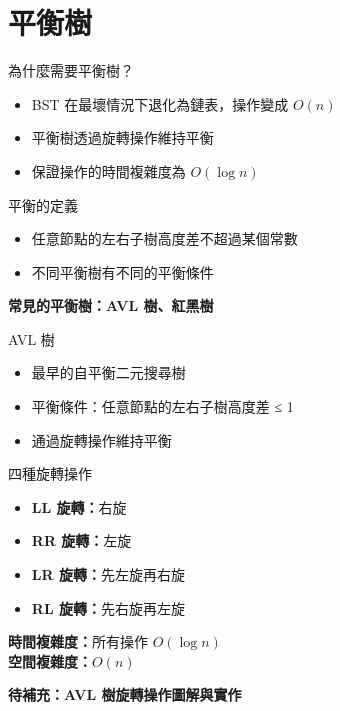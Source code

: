 \documentclass{beamer}
\begin{document}
\section{平衡樹}

\begin{frame}{為什麼需要平衡樹？}
\begin{itemize}
    \item BST 在最壞情況下退化為鏈表，操作變成 $O(n)$
    \item 平衡樹透過旋轉操作維持平衡
    \item 保證操作的時間複雜度為 $O(\log n)$
\end{itemize}

\vspace{1em}
\begin{block}{平衡的定義}
\begin{itemize}
    \item 任意節點的左右子樹高度差不超過某個常數
    \item 不同平衡樹有不同的平衡條件
\end{itemize}
\end{block}

\vspace{1em}
\begin{center}
\textbf{常見的平衡樹：AVL 樹、紅黑樹}
\end{center}
\end{frame}

\begin{frame}{AVL 樹}
\begin{itemize}
    \item 最早的自平衡二元搜尋樹
    \item 平衡條件：任意節點的左右子樹高度差 ≤ 1
    \item 通過旋轉操作維持平衡
\end{itemize}

\vspace{1em}
\begin{block}{四種旋轉操作}
\begin{itemize}
    \item \textbf{LL 旋轉：}右旋
    \item \textbf{RR 旋轉：}左旋
    \item \textbf{LR 旋轉：}先左旋再右旋
    \item \textbf{RL 旋轉：}先右旋再左旋
\end{itemize}
\end{block}

\vspace{1em}
\textbf{時間複雜度：}所有操作 $O(\log n)$\\
\textbf{空間複雜度：}$O(n)$

\vspace{1em}
\textbf{待補充：AVL 樹旋轉操作圖解與實作}
\end{frame}
\end{document}
